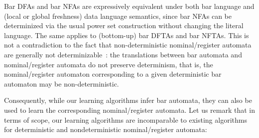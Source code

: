 \documentclass[a4paper,UKenglish,cleveref,autoref,thm-restate,numberwithinsect,final]{lipics-v2021}
\begin{document}
\begin{rem}
 Bar DFAs and bar NFAs are expressively equivalent under both bar language and (local or global freshness) data language semantics, since bar NFAs can be determinized via the usual power set construction without changing the literal language. The same applies to (bottom-up) bar DFTAs and bar NFTAs. This is not a contradiction to the fact that non-deterministic nominal/register automata are generally not determinizable~\cite{KaminskiFrancez94}: the translations between bar automata and nominal/register automata do not preserve determinism, that is, the nominal/register automaton corresponding to a given deterministic bar automaton may be non-deterministic.
\end{rem}
Consequently, while our learning algorithms infer bar automata, they can also be used to learn the corresponding nominal/register automata. Let us remark that in terms of scope, our learning algorithms are incomparable to existing  algorithms for deterministic and nondeterministic nominal/register automata:
\end{document}
